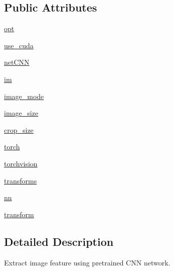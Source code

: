 \subsection*{Public Attributes}
\begin{DoxyCompactItemize}
\item 
\hyperlink{classparlai_1_1core_1_1image__featurizers_1_1ImageLoader_a66f4cdd0e0498467740ba5caed74a479}{opt}
\item 
\hyperlink{classparlai_1_1core_1_1image__featurizers_1_1ImageLoader_a2185015cf2607aab32309949d7f342ba}{use\+\_\+cuda}
\item 
\hyperlink{classparlai_1_1core_1_1image__featurizers_1_1ImageLoader_a1de0a1094d88467725f3f5e95ea632a4}{net\+C\+NN}
\item 
\hyperlink{classparlai_1_1core_1_1image__featurizers_1_1ImageLoader_a5a375010eb3a74e13b227d24ba1dbd71}{im}
\item 
\hyperlink{classparlai_1_1core_1_1image__featurizers_1_1ImageLoader_a41a066168f5df273890bc5629b9282bd}{image\+\_\+mode}
\item 
\hyperlink{classparlai_1_1core_1_1image__featurizers_1_1ImageLoader_a3b16ee0ee30e9a3de6a2f717d5aab57e}{image\+\_\+size}
\item 
\hyperlink{classparlai_1_1core_1_1image__featurizers_1_1ImageLoader_ac576a1193d349be494103b6ea25449b0}{crop\+\_\+size}
\item 
\hyperlink{classparlai_1_1core_1_1image__featurizers_1_1ImageLoader_a4b3a087dd54203cca9f3a8665a48c6d7}{torch}
\item 
\hyperlink{classparlai_1_1core_1_1image__featurizers_1_1ImageLoader_a4c2e2d68b78742c614d6a09b8f9c0257}{torchvision}
\item 
\hyperlink{classparlai_1_1core_1_1image__featurizers_1_1ImageLoader_a6da9f39fc312fc924d80b720f1696595}{transforms}
\item 
\hyperlink{classparlai_1_1core_1_1image__featurizers_1_1ImageLoader_af7d5f6cd8af0bdb87453cbbe6d7e440f}{nn}
\item 
\hyperlink{classparlai_1_1core_1_1image__featurizers_1_1ImageLoader_a4248bee2af90d76ab6f069b0356f5d86}{transform}
\end{DoxyCompactItemize}


\subsection{Detailed Description}
\begin{DoxyVerb}Extract image feature using pretrained CNN network.
\end{DoxyVerb}
 

